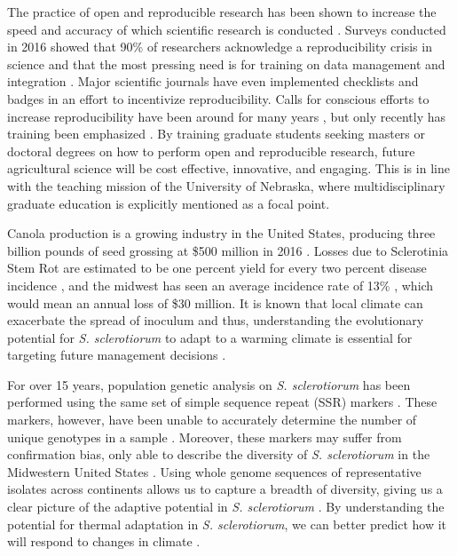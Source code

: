 \documentclass[12pt,letterpaper]{article}
\begin{document}
The practice of open and reproducible research has been shown to increase the speed and accuracy of which scientific research is conducted \citep{stewart-lowndes2017path, wilson2016good}.
Surveys conducted in 2016 showed that 90\% of researchers acknowledge a reproducibility crisis in science \citep{baker2016scientists} and that the most pressing need is for training on data management and integration \citep{barone2017unmet}. 
Major scientific journals have even implemented checklists \citep{nature2017announcement} and badges \citep{kidwell2016badges} in an effort to incentivize reproducibility.
Calls for conscious efforts to increase reproducibility have been around for many years \citep{buckheit1995wavelab, peng2011reproducible}, but only recently has training been emphasized \citep{schmidt2016stepping, stewart-lowndes2017path, wilson2016good}. 
By training graduate students seeking masters or doctoral degrees on how to perform open and reproducible research, future agricultural science will be cost effective, innovative, and engaging. 
This is in line with the teaching mission of the University of Nebraska, where multidisciplinary graduate education is explicitly mentioned as a focal point.

Canola production is a growing industry in the United States, producing three billion pounds of seed grossing at \$500 million in 2016 \citep{usda2017production, usda2017values}. Losses due to Sclerotinia Stem Rot are estimated to be one percent yield for every two percent disease incidence \citep{delrio2007impact}, and the midwest has seen an average incidence rate of 13\% \citep{markell2009sclerotinia}, which would mean an annual loss of \$30 million. 
It is known that local climate can exacerbate the spread of inoculum and thus, understanding the evolutionary potential for \textit{S. sclerotiorum} to adapt to a warming climate is essential for targeting future management decisions \citep{attanayake2014inferring,shea2000integrated,billiard2012sex}.

For over 15 years, population genetic analysis on \textit{S. sclerotiorum} has been performed using the same set of simple sequence repeat (SSR) markers \citep{sirjusingh2001characterization}. 
These markers, however, have been unable to accurately determine the number of unique genotypes in a sample \citep{lehner2017independently, lehner2017sclerotinia,arnaud2007standardizing}.
Moreover, these markers may suffer from confirmation bias, only able to describe the diversity of \textit{S. sclerotiorum} in the Midwestern United States \citep{attanayake2013sclerotinia}. 
Using whole genome sequences of representative isolates across continents allows us to capture a breadth of diversity, giving us a clear picture of the adaptive potential in \textit{S. sclerotiorum} \citep{grunwald2016population}.
By understanding the potential for thermal adaptation in \textit{S. sclerotiorum}, we can better predict how it will respond to changes in climate \citep{croll2016genetic}.
\end{document}
